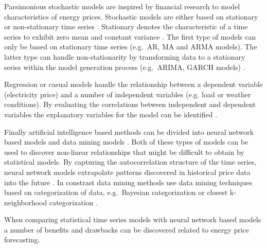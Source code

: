Parsimonious stochastic models are inspired by financial research to model characteristics of energy prices. Stochastic models are either based on stationary or non-stationary time series \cite{gonzalez2005modeling}. Stationary denotes the characteristic of a time series to exhibit zero mean and constant variance \cite{hyndman2012forecasting}. The first type of models can only be based on stationary time series (e.g.~AR, MA and ARMA models). The latter type can handle non-stationarity by transforming data to a stationary series within the model generation process (e.g.~ARIMA, GARCH models) \cite{hyndman2012forecasting, aggarwal2009electricity}. 

Regression or casual models handle the relationship between a dependent variable (electricity price) and a number of independent variables (e.g. load or weather conditions). By evaluating the correlations between independent and dependent variables the explanatory variables for the model can be identified \cite{aggarwal2009electricity}. 

Finally artificial intelligence based methods can be divided into neural network based models and data mining models \cite{aggarwal2009electricity}. 
Both of these types of models can be used to discover non-linear relationships that might be difficult to obtain by statistical models. By capturing the autocorrelation structure of the time series, neural network models extrapolate patterns discovered in historical price data into the future \cite{gonzalez2005modeling}. In constrast data mining methods use data mining techniques based on categorization of data, e.g.~Bayesian categorization or closest k-neighborhood categorization \cite{aggarwal2009electricity}. 




When comparing statistical time series models with neural network based models a number of benefits and drawbacks can be discovered related to energy price forecasting. 

